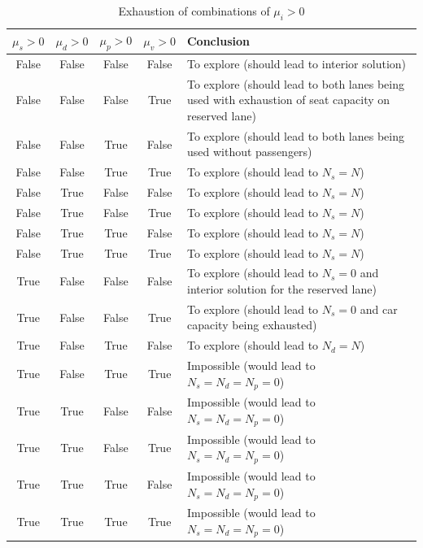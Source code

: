 \documentclass[english, a4paper]{article}
\theoremstyle{plain}
\theoremstyle{definition}
\theoremstyle{remark}
\begin{document}
\begin{table}
    \centering
    \begin{tabular}{|c|c|c|c|m{8cm}|}
        \hline
        $\mu_s > 0$ & $\mu_d > 0$ & $\mu_p > 0$ & $\mu_v > 0$ & Conclusion\\
        \hline
        \hline
        False & False & False & False & To explore (should lead to interior solution)\\
        \hline
        False & False & False & True & To explore (should lead to both lanes being used with exhaustion of seat capacity on reserved lane)\\
        \hline
        False & False & True & False & To explore (should lead to both lanes being used without passengers)\\
        \hline
        False & False & True & True & To explore (should lead to $N_s = N$)\\
        \hline
        False & True & False & False & To explore (should lead to $N_s = N$)\\
        \hline
        False & True & False & True & To explore (should lead to $N_s = N$)\\
        \hline
        False & True & True & False & To explore (should lead to $N_s = N$)\\
        \hline
        False & True & True & True & To explore (should lead to $N_s = N$)\\
        \hline
        True & False & False & False & To explore (should lead to $N_s = 0$ and interior solution for the reserved lane)\\
        \hline
        True & False & False & True & To explore (should lead to $N_s = 0$ and car capacity being exhausted)\\
        \hline
        True & False & True & False & To explore (should lead to $N_d = N$)\\
        \hline
        True & False & True & True & Impossible (would lead to $N_s = N_d = N_p = 0$)\\
        \hline
        True & True & False & False & Impossible (would lead to $N_s = N_d = N_p = 0$)\\
        \hline
        True & True & False & True & Impossible (would lead to $N_s = N_d = N_p = 0$)\\
        \hline
        True & True & True & False & Impossible (would lead to $N_s = N_d = N_p = 0$)\\
        \hline
        True & True & True & True & Impossible (would lead to $N_s = N_d = N_p = 0$)\\
        \hline
    \end{tabular}
    \caption{Exhaustion of combinations of $\mu_i > 0$}
    \label{table_cases_for_fixed_interior_phi_optim}
\end{table}
\end{document}

